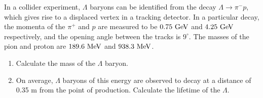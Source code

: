 \begin{problem}{2.7}
In a collider experiment, $\Lambda$ baryons can be identified from the decay $\Lambda\to\pi^-p$, which gives rise to a displaced vertex in a tracking detector. In a particular decay, the momenta of the $\pi^+$ and $p$ are measured to be $0.75 \text{ GeV}$ and $4.25 \text{ GeV}$ respectively, and the opening angle between the tracks is $9^\circ$. The masses of the pion and proton are $189.6 \text{ MeV}$ and $938.3 \text{ MeV}$.
\begin{enumerate}[label=(\alph*)]
    \item Calculate the mass of the $\Lambda$ baryon.
    \item On average, $\Lambda$ baryons of this energy are observed to decay at a distance of 0.35 m from the point of production. Calculate the lifetime of the $\Lambda$.
\end{enumerate}
\end{problem}
